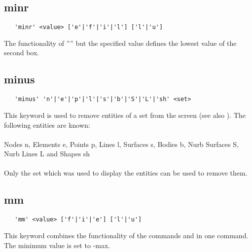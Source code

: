 \documentclass{article}
\begin{document}
\subsection{\label{minr}minr}
\begin{verbatim}
   'minr' <value> ['e'|'f'|'i'|'l'] ['l'|'u']
\end{verbatim}
The functionality of '''' but the specified value defines the lowest value of the second box.

\subsection{\label{minus}minus}
\begin{verbatim}
   'minus' 'n'|'e'|'p'|'l'|'s'|'b'|'S'|'L'|'sh' <set> 
\end{verbatim}
This keyword is used to remove entities of a set from the screen (see also ). The following entities are known:\\\\
Nodes n, Elements e, Points p, Lines l, Surfaces s, Bodies b, Nurb Surfaces S, Nurb Lines L and Shapes sh\\\\Only the set which was used to display the entities can be used to remove them.
 
\subsection{\label{mm}mm}
\begin{verbatim}
   'mm' <value> ['f'|'i'|'e'] ['l'|'u']
\end{verbatim}
This keyword combines the functionality of the commands  and  in one command. The minimum value is set to -max.
\end{document}
